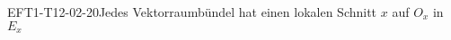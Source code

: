 
\begin{EXA}{EFT1-T12-02-20}{Jedes Vektorraumbündel hat einen lokalen Schnitt $x$ auf $O_x$ in $E_x$}
\end{EXA}
